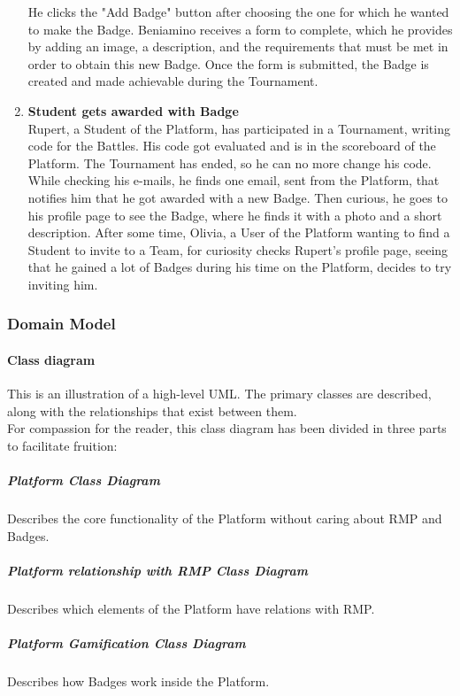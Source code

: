\begin{enumerate}[label= \textbf{SC\arabic*}]
    He clicks the "Add Badge" button after choosing the one for which he wanted to make the Badge. Beniamino receives a form to complete, which he provides by adding an image, a description, and the requirements that must be met in order 
    to obtain this new Badge. Once the form is submitted, the Badge is created and made achievable during the Tournament.
    \item \textbf{Student gets awarded with Badge} \label{sc:sc13} \\
    Rupert, a Student of the Platform, has participated in a Tournament, writing code for the Battles. His code got evaluated and is in the scoreboard of the Platform. The Tournament has ended, so he can no more change his code. 
    While checking his e-mails, he finds one email, sent from the Platform, that notifies him that he got awarded with a new Badge.
    Then curious, he goes to his profile page to see the Badge, where he finds it with a photo and a short description.
    After some time, Olivia, a User of the Platform wanting to find a Student to invite to a Team, for curiosity checks Rupert's profile page, seeing that he gained a lot of Badges during his time on the Platform, decides to try inviting him.
\end{enumerate}

\newpage

\subsubsection{Domain Model}

\paragraph{Class diagram}
This is an illustration of a high-level UML. The primary classes are described, along with the relationships that exist between them.
\\For compassion for the reader, this class diagram has been divided in three parts to facilitate fruition:
\newpage
\subparagraph{Platform Class Diagram}
Describes the core functionality of the Platform without caring about RMP and Badges.\\
\newpage
\subparagraph{Platform relationship with RMP Class Diagram}
Describes which elements of the Platform have relations with RMP.\\
\subparagraph{Platform Gamification Class Diagram}
Describes how Badges work inside the Platform.\\
\newpage 


